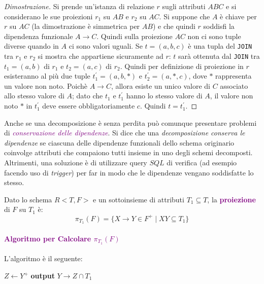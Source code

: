 \begin{proof}[Dimostrazione]
    Si prende un'istanza di relazione $r$ sugli attributi $ABC$ e si considerano
    le sue proiezioni $r_1$ su $AB$ e $r_2$ su $AC$.
    Si suppone che $A$ è chiave per $r$ su $AC$ (la dimostrazione è simmetrica per $AB$) e
    che quindi $r$ soddisfi la dipendenza funzionale $A \rightarrow C$. Quindi sulla
    proiezione $AC$ non ci sono tuple diverse quando in $A$ ci sono valori uguali.
    Se $t = (a,b,c)$ è una tupla del \verb|JOIN| tra $r_1$ e $r_2$ si mostra che appartiene
    sicuramente ad $r$: $t$ sarà ottenuta dal \verb|JOIN| tra $t_1 = (a,b)$ di $r_1$
    e $t_2 = (a,c)$ di $r_2$. Quindi per definizione di proiezione in $r$ esisteranno al più due tuple
    $t_{1}^{'} = (a,b,*)$ e $t_{2}^{'} = (a,*,c)$, dove $*$ rappresenta un valore non noto.
    Poichè $A \rightarrow C$, allora esiste un unico valore di $C$ associato allo stesso valore di $A$;
    dato che $t_1$ e $t_{1}^{'}$ hanno lo stesso valore di $A$, il valore non noto $*$ in $t_{1}^{'}$
    deve essere obbligatoriamente $c$. Quindi $t = t_{1}^{'}$.
\end{proof}

Anche se una decomposizione è senza perdita può comunque presentare problemi di \emph{\textcolor{purple}{conservazione delle dipendenze}}.
Si dice che una \emph{decomposizione conserva le dipendenze} se ciascuna delle dipendenze funzionali dello schema originario
coinvolge attributi che compaiono tutti insieme in uno degli schemi decomposti.
Altrimenti, una soluzione è di utilizzare query $SQL$ di verifica (ad esempio facendo uso di \emph{trigger}) per
far in modo che le dipendenze vengano soddisfatte lo stesso.

\begin{definition}[Proiezione]
    Dato lo schema $R<T,F>$ e un sottoinsieme di attributi $T_1 \subseteq T$,
    la \textbf{\textcolor{purple}{proiezione}} di $F$ su $T_1$ è:
    \begin{equation*}
        \pi_{T_1}(F) = \{X \rightarrow Y \in F^+ \;|\; XY \subseteq T_1\}
    \end{equation*}
\end{definition}

\paragraph{\textcolor{purple}{Algoritmo per Calcolare $\pi_{T_1}(F)$}}
L'algoritmo è il seguente:
\begin{algorithm}
    \begin{algorithmic}
            \State $Z \gets Y^+$
            \State \textbf{output} $Y \rightarrow Z \cap T_1$
        \EndFor
    \end{algorithmic}
\end{algorithm}

